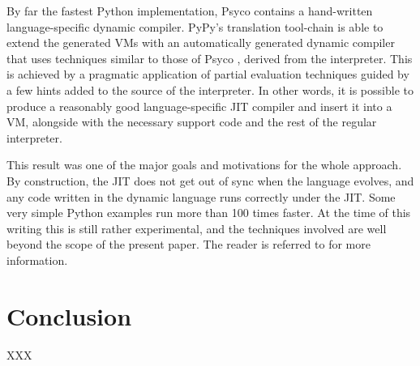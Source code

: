 \documentclass{llncs}
\begin{document}
By far the fastest Python implementation, Psyco \cite{psyco-software} contains a
hand-written language-specific dynamic compiler.  PyPy's translation
tool-chain is able to extend the generated VMs with an automatically
generated dynamic compiler that uses techniques similar to those of Psyco
\cite{Psyco-paper}, derived from the
interpreter.  This is achieved by a pragmatic application of partial
evaluation techniques guided by a few hints added to the source of the
interpreter.  In other words, it is possible to produce a reasonably
good language-specific JIT compiler and insert it into a VM, alongside
with the necessary support code and the rest of the regular interpreter.

This result was one of the major goals and motivations for the whole
approach.  By construction, the JIT does not get out of sync when the
language evolves, and any code written in the dynamic language runs
correctly under the JIT.  Some very simple Python examples run more than
100 times faster.  At the time of this writing this is still rather
experimental, and the techniques involved are well beyond the scope of
the present paper.  The reader is referred to \cite{D08.2} for more
information.



\section{Conclusion}
XXX 


\end{document}

